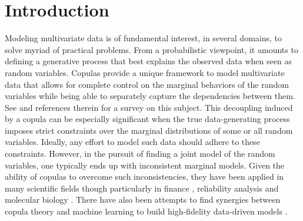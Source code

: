 \documentclass{article}
\theoremstyle{plain}
\theoremstyle{definition}
\theoremstyle{remark}
\begin{document}
\section{Introduction}\label{sec:Intro}
Modeling multivariate data is of fundamental interest, in several domains, to solve myriad of practical problems. From a probabilistic viewpoint, it amounts to defining a generative process that best explains the observed data when seen as random variables. Copulas provide a unique framework to model multivariate data that allows for complete control on the marginal behaviors of the random variables while being able to separately capture the dependencies between them. See \citep{Durante2010CopulaIntro} and references therein for a survey on this subject.  This decoupling induced by a copula can be especially significant when the true data-generating process imposes strict constraints over the marginal distributions of some or all random variables. Ideally, any effort to model such data should adhere to these constraints. However, in the pursuit of finding a joint model of the random variables, one typically ends up with inconsistent marginal models.  Given the ability of copulas to overcome such inconsistencies, they have been applied in many scientific fields though particularly in finance \citep{Genest2009CopulaInFinance,Cherubini2004copula}, reliability analysis \citep{Rychlik2010Reliability} and molecular biology \citep{Bilgrau2012quantification,Li2011,Kim2008,Ma2012Gini}.  There have also been  attempts to find synergies between copula theory and machine learning to build high-fidelity data-driven models \citep[see][for a survey on the applications of copulas in machine learning approaches]{Elidan2013}.
\end{document}
